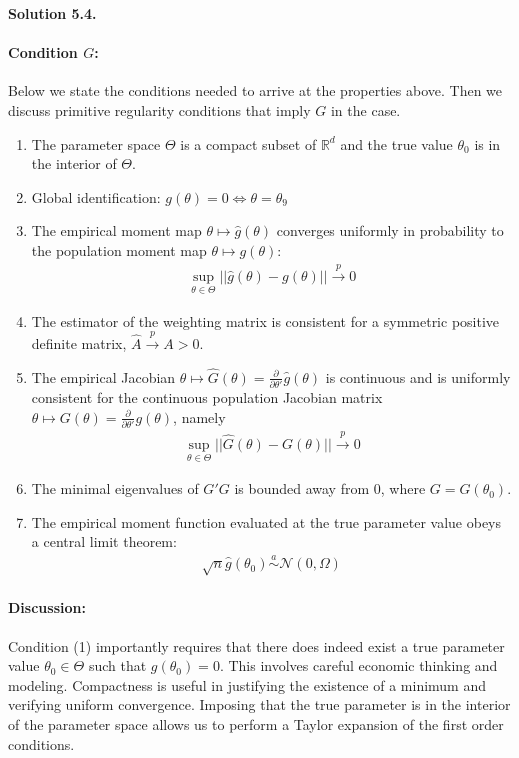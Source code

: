 \documentclass[11pt]{article}
\newenvironment{solution}[1]
    {\bigskip\noindent\textbf{Solution #1.} \par}
    {\medskip}
\newcommand{\R}{\mathbb{R}}
\begin{document}
\begin{solution}{5.4}
\paragraph{Condition $G$:}
Below we state the conditions needed to arrive at the properties above. Then we discuss primitive regularity conditions that imply $G$ in the \cite{hs1982gmm} case.
\begin{enumerate}
    \item The parameter space $\Theta$ is a compact subset of $\R^d$ and the true value $\theta_0$ is in the interior of $\Theta.$
    \item Global identification: $g(\theta) = 0 \iff \theta = \theta_9$
    \item The empirical moment map $\theta \mapsto \hat{g}(\theta)$ converges uniformly in probability to the population moment map $\theta \mapsto g(\theta):$
    \begin{align*}
        \sup_{\theta \in \Theta} || \hat{g}(\theta) - g(\theta) || \xrightarrow{p} 0
    \end{align*}
    \item The estimator of the weighting matrix is consistent for a symmetric positive definite matrix, $\hat A \xrightarrow{p} A > 0.$
    \item The empirical Jacobian $\theta \mapsto \hat{G}(\theta) = \frac{\partial}{\partial \theta'}\hat{g}(\theta)$ is continuous and is uniformly consistent for the continuous population Jacobian matrix $\theta \mapsto G(\theta) = \frac{\partial}{\partial \theta'}g(\theta)$, namely
    \begin{align*}
        \sup_{\theta \in \Theta} || \hat{G}(\theta) - G(\theta) || \xrightarrow{p} 0
    \end{align*}
    \item The minimal eigenvalues of $G'G$ is bounded away from 0, where $G = G(\theta_0).$
    \item The empirical moment function evaluated at the true parameter value obeys a central limit theorem:
    \begin{align*}
        \sqrt{n}\hat{g}(\theta_0) \overset{a}{\sim} \mathcal{N}(0,\Omega)
    \end{align*}
\end{enumerate}

\paragraph{Discussion:}

Condition (1) importantly requires that there does indeed exist a true parameter value $\theta_0 \in \Theta$ such that $g(\theta_0) = 0.$ This involves careful economic thinking and modeling. Compactness is useful in justifying the existence of a minimum and verifying uniform convergence. Imposing that the true parameter is in the interior of the parameter space allows us to perform a Taylor expansion of the first order conditions. 


\end{solution}
\end{document}
